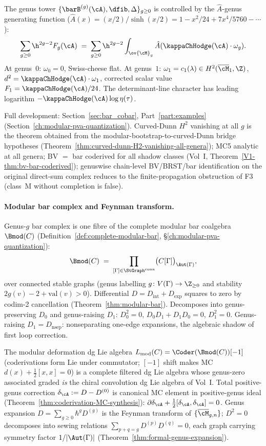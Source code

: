 The genus tower $\{\barB^{(g)}(\cA), \dfib, \Delta\}_{g \ge 0}$
is controlled by the $\hat{A}$-genus generating function
($\hat{A}(x) = (x/2)/\sinh(x/2) = 1 - x^2/24 + 7x^4/5760 - \cdots$):
\[
\sum_{g \geq 0} \h^{2g-2} F_g(\cA)
\;=\;
\sum_{g \geq 0} \h^{2g-2}
\int_{\ov{\cM}_g} \hat{A}(\kappaChHodge(\cA) \cdot \omega_g).
\]
At genus~$0$: $\omega_0 = 0$, Swiss-cheese flat. At genus~$1$:
$\omega_1 = c_1(\lambda) \in H^2(\overline{\cM}_1, \Z)$,
$d^2 = \kappaChHodge(\cA) \cdot \omega_1$, corrected
scalar value $F_1=\kappaChHodge(\cA)/24$. The determinant-line
character has leading logarithm
$-\kappaChHodge(\cA)\log\eta(\tau)$.

Full development: Section~\ref{sec:bar_cobar},
Part~\ref{part:examples} (Section~\ref{ch:modular-pva-quantization}).
Curved-Dunn $H^2$ vanishing at all $g$ is the theorem obtained from
the modular-bootstrap-to-curved-Dunn bridge hypotheses
(Theorem~\ref{thm:curved-dunn-H2-vanishing-all-genera}); MC5
analytic at all genera; BV $=$ bar coderived for all shadow
classes (Vol~I, Theorem~\ref*{V1-thm:bv-bar-coderived});
genuswise chain-level BV/BRST/bar identification on the original
direct-sum complex reduces to the finite-propagation obstruction
of F3 (class~M without completion is false).

\paragraph{Modular bar complex and Feynman transform.}
Genus-$g$ bar complex is one fibre of the complete modular bar
coalgebra $\Bmod(C)$
(Definition~\ref{def:complete-modular-bar},
\S\ref{ch:modular-pva-quantization}):
\[
\Bmod(C)
\;=\;
\prod_{[\Gamma] \in \StGraph^{\mathrm{conn}}}
\bigl(C[\Gamma]\bigr)_{\Aut(\Gamma)},
\]
over connected stable graphs (genus labelling
$g\colon V(\Gamma) \to \Z_{\ge 0}$ and stability
$2g(v) - 2 + \mathrm{val}(v) > 0$). Differential
$D = D_{\mathrm{int}} + D_{\mathrm{exp}}$ squares to zero by
codim-2 cancellation
(Theorem~\ref{thm:modular-bar}). Decomposes into
genus-preserving $D_0$ and genus-raising $D_1$:
$D_0^2 = 0$, $D_0 D_1 + D_1 D_0 = 0$, $D_1^2 = 0$.
Genus-raising $D_1 = D_{\mathrm{nsep}}$: nonseparating one-edge
expansions, the algebraic shadow of first loop correction.

The modular deformation dg Lie algebra $L_{\mathrm{mod}}(C) =
\Coder(\Bmod(C))[-1]$ (coderivations form Lie under commutator;
$[-1]$ shift makes MC $d(x) + \tfrac{1}{2}[x,x] = 0$) is a
complete filtered dg Lie algebra whose genus-zero associated
graded \emph{is} the chiral convolution dg Lie algebra of
Vol~I. Total positive-genus correction
$\delta_\cA := D - D^{(0)}$ is canonical MC element in
positive-genus ideal
(Theorem~\ref{thm:coderivation-MC-synthesis}):
$\partial\delta_\cA + \tfrac{1}{2}[\delta_\cA, \delta_\cA] = 0$.
Genus expansion $D = \sum_{g \ge 0} \hbar^g D^{(g)}$ is the
Feynman transform of $\{\overline{\cM}_{g,n}\}$;
$D^2 = 0$ decomposes into sewing relations
$\sum_{p+q=g} D^{(p)} D^{(q)} = 0$, each graph carrying symmetry
factor $1/|\Aut(\Gamma)|$
(Theorem~\ref{thm:formal-genus-expansion}).


